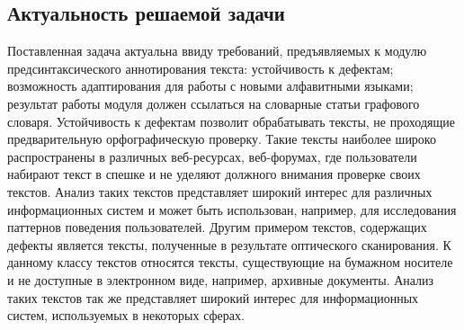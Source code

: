 \subsection{Актуальность решаемой задачи}
Поставленная задача актуальна ввиду требований, предъявляемых к модулю предсинтаксического аннотирования текста: устойчивость к дефектам; возможность адаптирования для работы с новыми алфавитными языками; результат работы модуля должен ссылаться на словарные статьи графового словаря. Устойчивость к дефектам позволит обрабатывать тексты, не проходящие предварительную орфографическую проверку. Такие тексты наиболее широко распространены в различных веб-ресурсах, веб-форумах, где пользователи набирают текст в спешке и не уделяют должного внимания проверке своих текстов. Анализ таких текстов представляет широкий интерес для различных информационных систем и может быть использован, например,  для исследования паттернов поведения пользователей. Другим примером текстов, содержащих дефекты является тексты, полученные в результате оптического сканирования. К данному классу текстов относятся тексты, существующие на бумажном носителе и не доступные в электронном виде, например, архивные документы. Анализ таких текстов так же представляет широкий интерес для информационных систем, используемых в некоторых сферах.